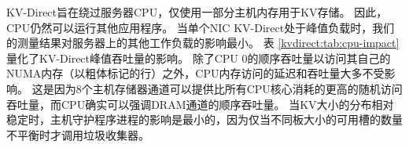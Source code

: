 KV-Direct旨在绕过服务器CPU，仅使用一部分主机内存用于KV存储。 因此，CPU仍然可以运行其他应用程序。
当单个NIC KV-Direct处于峰值负载时，我们的测量结果对服务器上的其他工作负载的影响最小。
表 \ref {kvdirect:tab:cpu-impact} 量化了KV-Direct峰值吞吐量的影响。
除了CPU 0的顺序吞吐量以访问其自己的NUMA内存（以粗体标记的行）之外，CPU内存访问的延迟和吞吐量大多不受影响。
这是因为8个主机存储器通道可以提供比所有CPU核心消耗的更高的随机访问吞吐量，而CPU确实可以强调DRAM通道的顺序吞吐量。
当KV大小的分布相对稳定时，主机守护程序进程的影响是最小的，因为仅当不同板大小的可用槽的数量不平衡时才调用垃圾收集器。
